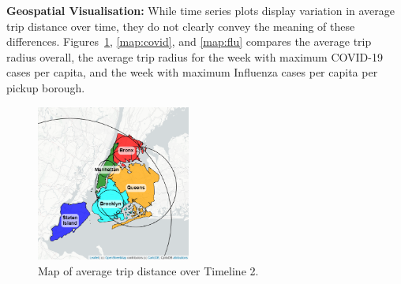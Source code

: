 \documentclass[11pt]{article}
\begin{document}
\textbf{Geospatial Visualisation:}
While time series plots display variation in average trip distance over time, 
they do not clearly convey the meaning of these differences.
Figures~\ref{map:overall}, \ref{map:covid}, and \ref{map:flu} compares the average trip radius overall, 
the average trip radius for the week with maximum COVID-19 cases per capita, 
and the week with maximum Influenza cases per capita per pickup borough.


\begin{figure}[H]

    \centering

    \includegraphics[width=0.45\textwidth]{../plots/map-avg-trip-distance-overall-pu_borough-MODIFIED.png}

    \caption{Map of average trip distance over Timeline 2.} 
    \label{map:overall}
\end{figure}

\end{document}
